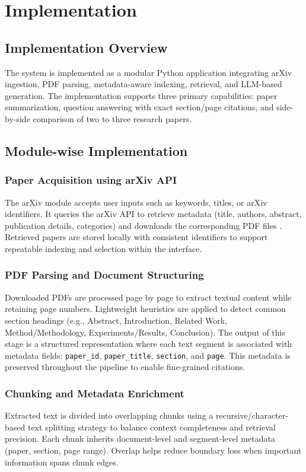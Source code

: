 \chapter{Implementation}

\section{Implementation Overview}
The system is implemented as a modular Python application integrating arXiv ingestion, PDF parsing, metadata-aware indexing, retrieval, and LLM-based generation. The implementation supports three primary capabilities: paper summarization, question answering with exact section/page citations, and side-by-side comparison of two to three research papers.

\section{Module-wise Implementation}

\subsection{Paper Acquisition using arXiv API}
The arXiv module accepts user inputs such as keywords, titles, or arXiv identifiers. It queries the arXiv API to retrieve metadata (title, authors, abstract, publication details, categories) and downloads the corresponding PDF files \cite{b12}. Retrieved papers are stored locally with consistent identifiers to support repeatable indexing and selection within the interface.

\subsection{PDF Parsing and Document Structuring}
Downloaded PDFs are processed page by page to extract textual content while retaining page numbers. Lightweight heuristics are applied to detect common section headings (e.g., Abstract, Introduction, Related Work, Method/Methodology, Experiments/Results, Conclusion). The output of this stage is a structured representation where each text segment is associated with metadata fields: \texttt{paper\_id}, \texttt{paper\_title}, \texttt{section}, and \texttt{page}. This metadata is preserved throughout the pipeline to enable fine-grained citations.

\subsection{Chunking and Metadata Enrichment}
Extracted text is divided into overlapping chunks using a recursive/character-based text splitting strategy to balance context completeness and retrieval precision. Each chunk inherits document-level and segment-level metadata (paper, section, page range). Overlap helps reduce boundary loss when important information spans chunk edges.

